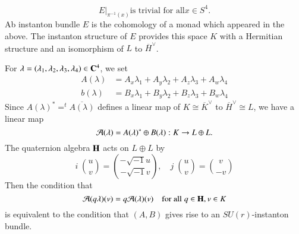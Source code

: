 
\begin{equation}
E|_{\pi^{-1}(x)} \text{is trivial for all} x \in S^{4}.\tag{1.5.2}\label{art12-eq-1.5.2} 
\end{equation}
Ab instanton bundle $E$ is the cohomology of a monad which appeared in the above. The instanton structure of $E$ provides this space $K$ with a Hermitian structure and an isomorphism of $L$ to $\overline{H}^{\vee}$.

For  $\lambda =(\lambda_{1}, \lambda_{2}, \lambda_{3}, \lambda_{4}) \in \mathbf{C}^{4}$, we set
\begin{align*}
A(\lambda) &= A_{x}\lambda_{1} + A_{y}\lambda_{2} +A_{z}\lambda_{3} + A_{w}\lambda_{4}\\
b(\lambda) &= B_{x}\lambda_{1} + B_{y}\lambda_{2} +B_{z}\lambda_{3} + B_{w}\lambda_{4}
\end{align*}
Since $A(\lambda)^{*} = ^{t}\overline{A(\lambda)}$ defines a linear map of $K \cong\overline{K}^{\vee}$ to
$\overline{H}^{\vee} \cong L$, we have a linear map
$$
\mathcal{A}(\lambda) = A(\lambda)^{*} \oplus B(\lambda) : K \rightarrow L \oplus L.
$$
The quaternion algebra $\mathbf{H}$ acts on $L \oplus L$ by
$$
i \;\binom{u}{v} = \binom{-\sqrt{-1}u}{-\sqrt{-1}v}, \quad j\; \binom{u}{v}= \binom{v}{-v}
$$ 
Then the condition that
$$
\mathcal{A}(q\lambda)(v)=q \mathcal{A}(\lambda)(v)\quad \text{for all}\; q \in \mathbf{H}, v \in K
$$
is equivalent to the condition that $(A, B)$ gives rise to an $SU(r)$-instanton bundle.

